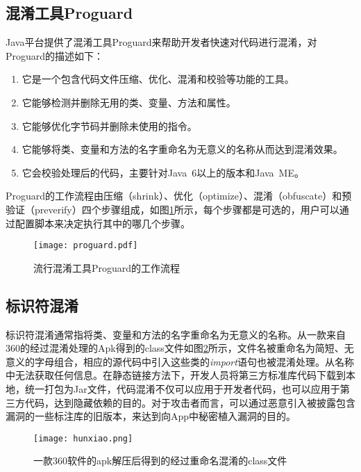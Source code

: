 \subsection{混淆工具Proguard}
Java平台提供了混淆工具Proguard\cite{proguard}来帮助开发者快速对代码进行混淆，对Proguard的描述如下：
\begin{enumerate}
\item{它是一个包含代码文件压缩、优化、混淆和校验等功能的工具。}
\item{它能够检测并删除无用的类、变量、方法和属性。}
\item{它能够优化字节码并删除未使用的指令。}
\item{它能够将类、变量和方法的名字重命名为无意义的名称从而达到混淆效果。}
\item{它会校验处理后的代码，主要针对Java\ 6以上的版本和Java\ ME。}
\end{enumerate}

Proguard的工作流程由压缩（shrink）、优化（optimize）、混淆（obfuscate）和预验证（preverify）四个步骤组成，如图\ref{fig:proguard}所示，每个步骤都是可选的，用户可以通过配置脚本来决定执行其中的哪几个步骤\cite{csdn}。

\begin{figure}[!htp]
  \centering
  \texttt{[image: proguard.pdf]} \\
  \caption{流行混淆工具Proguard的工作流程}
 \label{fig:proguard}
\end{figure}


\subsection{标识符混淆}
标识符混淆通常指将类、变量和方法的名字重命名为无意义的名称。从一款来自360的经过混淆处理的Apk得到的class文件如图\ref{fig:hunxiao}所示，文件名被重命名为简短、无意义的字母组合，相应的源代码中引入这些类的\textit{import}语句也被混淆处理。从名称中无法获取任何信息。在静态链接方法下，开发人员将第三方标准库代码下载到本地，统一打包为Jar文件，代码混淆不仅可以应用于开发者代码，也可以应用于第三方代码，达到隐藏依赖的目的。对于攻击者而言，可以通过恶意引入被披露包含漏洞的一些标注库的旧版本，来达到向App中秘密植入漏洞的目的\cite{hammad2018large}。

\begin{figure}[!htp]
  \centering
  \texttt{[image: hunxiao.png]} \\
  \caption{一款360软件的apk解压后得到的经过重命名混淆的class文件}
 \label{fig:hunxiao}
\end{figure}

